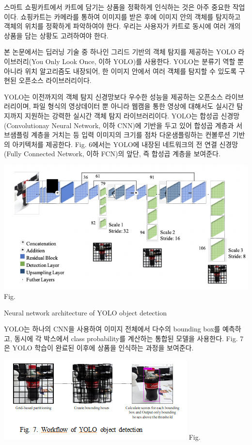\documentclass[smallextended]{svjour3}       %
\begin{document}
스마트 쇼핑카트에서 카트에 담기는 상품을 정확하게 인식하는 것은 아주
중요한 작업이다. 쇼핑카트는 카메라를 통하여 이미지를 받은 후에 이미지
안의 객체를 탐지하고 객체의 위치를 정확하게 파악하여야 한다. 우리는
사용자가 카트로 동시에 여러 개의 상품을 담는 상황도 고려하여야 한다.

본 논문에서는 딥러닝 기술 중 하나인 그리드 기반의 객체 탐지를 제공하는
YOLO 라이브러리(You Only Look Once, 이하 YOLO)를 사용한다. YOLO는 분류기
역할 뿐 아니라 위치 알고리즘도 내장되어, 한 이미지 안에서 여러 객체를
탐지할 수 있도록 구현된 오픈소스 라이브러리이다\cite{redmon2016you}.

YOLO는 이전까지의 객체 탐지 신경망보다 우수한 성능을 제공하는 오픈소스
라이브러리이며, 파일 형식의 영상데이터 뿐 아니라 웹캠을 통한 영상에
대해서도 실시간 탐지까지 지원하는 강력한 실시간 객체 탐지
라이브러리이다. YOLO는 합성곱 신경망(Convolutionay Neural Network, 이하
CNN)에 기반을 두고 있어 합성곱 계층과 서브샘플링 계층을 거치는 등 입력
이미지의 크기를 점차 다운샘플링하는 컨볼루션 기반의 아키텍처를 제공한다.
Fig. 6에서는 YOLO에 내장된 네트워크의 전 연결 신경망(Fully Connected
Network, 이하 FCN)의 앞단, 즉 합성곱 계층을 보여준다.

\includegraphics{../fig/fig6.png} Fig.

Neural network architecture of YOLO object detection

YOLO는 하나의 CNN을 사용하여 이미지 전체에서 다수의 bounding box를
예측하고, 동시에 각 박스에서 class probability를 계산하는 통합된 모델을
사용한다. Fig. 7은 YOLO 학습이 완료된 이후에 상품을 인식하는 과정을
보여준다.

\includegraphics{../fig/fig7.png} Fig.
\end{document}
